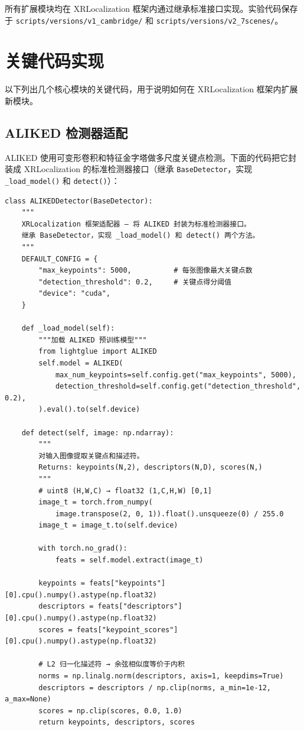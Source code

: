 \documentclass[12pt,a4paper]{ctexart}
\begin{document}
所有扩展模块均在 XRLocalization 框架内通过继承标准接口实现。实验代码保存于
\texttt{scripts/versions/v1\_cambridge/} 和 \texttt{scripts/versions/v2\_7scenes/}。

\section{关键代码实现}

以下列出几个核心模块的关键代码，用于说明如何在 XRLocalization 框架内扩展新模块。

\subsection{ALIKED 检测器适配}

ALIKED 使用可变形卷积和特征金字塔做多尺度关键点检测。下面的代码把它封装成 XRLocalization
的标准检测器接口（继承 \texttt{BaseDetector}，实现 \texttt{\_load\_model()} 和 \texttt{detect()}）：

\begin{lstlisting}[style=pythonstyle, caption={ALIKED 检测器适配代码}]
class ALIKEDDetector(BaseDetector):
    """
    XRLocalization 框架适配器 — 将 ALIKED 封装为标准检测器接口。
    继承 BaseDetector，实现 _load_model() 和 detect() 两个方法。
    """
    DEFAULT_CONFIG = {
        "max_keypoints": 5000,          # 每张图像最大关键点数
        "detection_threshold": 0.2,     # 关键点得分阈值
        "device": "cuda",
    }

    def _load_model(self):
        """加载 ALIKED 预训练模型"""
        from lightglue import ALIKED
        self.model = ALIKED(
            max_num_keypoints=self.config.get("max_keypoints", 5000),
            detection_threshold=self.config.get("detection_threshold", 0.2),
        ).eval().to(self.device)

    def detect(self, image: np.ndarray):
        """
        对输入图像提取关键点和描述符。
        Returns: keypoints(N,2), descriptors(N,D), scores(N,)
        """
        # uint8 (H,W,C) → float32 (1,C,H,W) [0,1]
        image_t = torch.from_numpy(
            image.transpose(2, 0, 1)).float().unsqueeze(0) / 255.0
        image_t = image_t.to(self.device)

        with torch.no_grad():
            feats = self.model.extract(image_t)

        keypoints = feats["keypoints"][0].cpu().numpy().astype(np.float32)
        descriptors = feats["descriptors"][0].cpu().numpy().astype(np.float32)
        scores = feats["keypoint_scores"][0].cpu().numpy().astype(np.float32)

        # L2 归一化描述符 → 余弦相似度等价于内积
        norms = np.linalg.norm(descriptors, axis=1, keepdims=True)
        descriptors = descriptors / np.clip(norms, a_min=1e-12, a_max=None)
        scores = np.clip(scores, 0.0, 1.0)
        return keypoints, descriptors, scores
\end{lstlisting}
\end{document}
